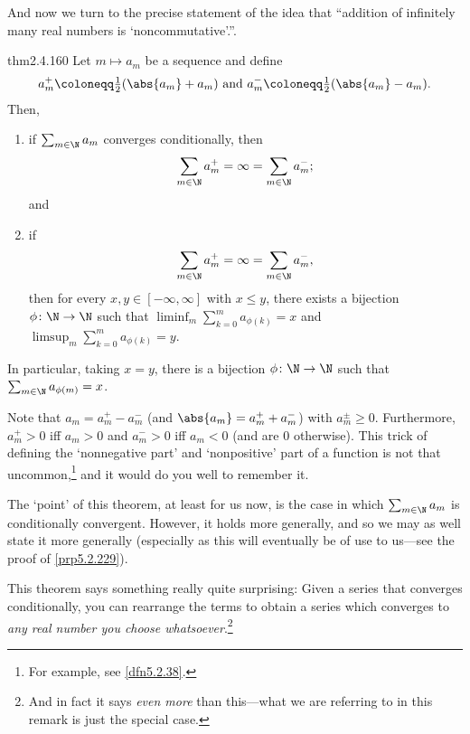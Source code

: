 And now we turn to the precise statement of the idea that ``addition of infinitely many real numbers is `noncommutative'.''.
\begin{thm}{}{thm2.4.160}
Let $m\mapsto a_m$ be a sequence and define
\begin{equation}
a_m^+\coloneqq \tfrac{1}{2}(\abs{a_m}+a_m)\text{ and }a_m^-\coloneqq \tfrac{1}{2}(\abs{a_m}-a_m).
\end{equation}
Then,
\begin{enumerate}
\item \label{thm2.4.160.i}if $\sum _{m\in \N}a_m$ converges conditionally, then
\begin{equation}
\sum _{m\in \N}a_m^+=\infty =\sum _{m\in \N}a_m^-;
\end{equation}
and
\item \label{thm2.4.160.ii}if
\begin{equation}
\sum _{m\in \N}a_m^+=\infty =\sum _{m\in \N}a_m^-,
\end{equation}
then for every $x,y\in [-\infty ,\infty ]$ with $x\leq y$, there exists a bijection $\phi \colon \N \rightarrow \N$ such that $\liminf _m\sum _{k=0}^ma_{\phi (k)}=x$ and $\limsup _m\sum _{k=0}^ma_{\phi (k)}=y$.
\end{enumerate}
In particular, taking $x=y$, there is a bijection $\phi \colon \N \rightarrow \N$ such that $\sum _{m\in \N}a_{\phi (m)}=x$.
\begin{rmk}
Note that $a_m=a_m^+-a_m^-$ (and $\abs{a_m}=a_m^++a_m^-$) with $a_m^{\pm}\geq 0$.  Furthermore, $a_m^+>0$ iff $a_m>0$ and $a_m^->0$ iff $a_m<0$ (and are $0$ otherwise).  This trick of defining the `nonnegative part' and `nonpositive' part of a function is not that uncommon,\footnote{For example, see \cref{dfn5.2.38}.} and it would do you well to remember it.
\end{rmk}
\begin{rmk}
The `point' of this theorem, at least for us now, is the case in which $\sum _{m\in \N}a_m$ is conditionally convergent.  However, it holds more generally, and so we may as well state it more generally (especially as this will eventually be of use to us---see the proof of \cref{prp5.2.229}).
\end{rmk}
\begin{rmk}
This theorem says something really quite surprising:  Given a series that converges conditionally, you can rearrange the terms to obtain a series which converges to \emph{any real number you choose whatsoever}.\footnote{And in fact it says \emph{even more} than this---what we are referring to in this remark is just the special case.}

\end{rmk}
\end{thm}
